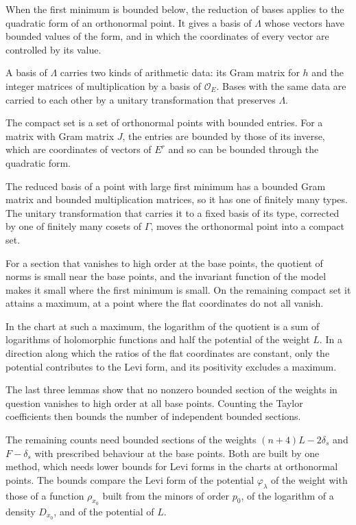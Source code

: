 When the first minimum is bounded below, the reduction of bases applies to the quadratic form of an
orthonormal point. It gives a basis of $\Lambda$ whose vectors have bounded values of the form, and in which
the coordinates of every vector are controlled by its value.

A basis of $\Lambda$ carries two kinds of arithmetic data: its Gram matrix for $h$ and the integer matrices
of multiplication by a basis of $\mathcal O_E$. Bases with the same data are carried to each other by a
unitary transformation that preserves $\Lambda$.

The compact set is a set of orthonormal points with bounded entries. For a matrix with Gram matrix $J$, the
entries are bounded by those of its inverse, which are coordinates of vectors of $E^r$ and so can be bounded
through the quadratic form.

The reduced basis of a point with large first minimum has a bounded Gram matrix and bounded multiplication
matrices, so it has one of finitely many types. The unitary transformation that carries it to a fixed basis
of its type, corrected by one of finitely many cosets of $\Gamma$, moves the orthonormal point into a compact
set.

For a section that vanishes to high order at the base points, the quotient of norms is small near the base
points, and the invariant function of the model makes it small where the first minimum is small. On the
remaining compact set it attains a maximum, at a point where the flat coordinates do not all vanish.

In the chart at such a maximum, the logarithm of the quotient is a sum of logarithms of holomorphic
functions and half the potential of the weight $L$. In a direction along which the ratios of the flat
coordinates are constant, only the potential contributes to the Levi form, and its positivity excludes a
maximum.

The last three lemmas show that no nonzero bounded section of the weights in question vanishes to high
order at all base points. Counting the Taylor coefficients then bounds the number of independent bounded
sections.

The remaining counts need bounded sections of the weights $(n+4)L-2\delta_s$ and $F-\delta_s$ with prescribed
behaviour at the base points. Both are built by one method, which needs lower bounds for Levi forms in the
charts at orthonormal points. The bounds compare the Levi form of the potential $\varphi_\lambda$ of the weight with
those of a function $\rho_{x_0}$ built from the minors of order $p_0$, of the logarithm of a density $D_{x_0}$, and
of the potential of $L$.

